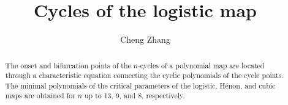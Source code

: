 \documentclass[twocolumn]{revtex4-1}
\begin{document}
\newcommand{\odd}{\mathrm{odd}}

\newcommand{\vct}[1]{\mathbf{#1}}




\newcommand{\vx}{\vct x}
\newcommand{\Tr}{\mathrm{Tr}}
\newcommand{\Pset}{\mathcal P}
\newcommand{\NB}{N_\Pset}
\newcommand{\Rlam}{(R, \lambda)}

\newcommand{\eq}{Eq.}
\newcommand{\eqs}{Eqs.}
\newcommand{\req}[1]{(\ref{eq:#1})}
\newcommand{\refeq}[1]{\eq\,\req{#1}}
\newcommand{\refeqs}[1]{\eqs\,\req{#1}}
\newcommand{\reqsub}[2]{(\ref{eq:#1}#2)}
\newcommand{\refeqsub}[2]{\eq\,\reqsub{#1}{#2}}
\newcommand{\refeqssub}[2]{\eqs\,\reqsub{#1}{#2}}

\newcommand{\refthm}[1]{Theorem \ref{thm:#1}}
\newcommand{\refthms}[1]{Theorems \ref{thm:#1}}
\newcommand{\refsec}[1]{Section \ref{sec:#1}}
\newcommand{\refsecs}[1]{Sections \ref{sec:#1}}
\newcommand{\refapd}[1]{Appendix \ref{apd:#1}}
\newcommand{\reftab}[1]{Table \ref{tab:#1}}
\newcommand{\reftabs}[1]{Tables \ref{tab:#1}}
\newcommand{\reffig}[1]{Fig. \ref{fig:#1}}
\newcommand{\reffigs}[1]{Figs. \ref{fig:#1}}

\newtheorem{theorem}{Theorem}
\newenvironment{remark}[1][1]%
{\par\noindent\textbf{Remark #1.} }{\medskip}






\title{Cycles of the logistic map}
\author{Cheng Zhang}

\begin{abstract}
%
The onset and bifurcation points of the $n$-cycles of
  a polynomial map are located
  through a characteristic equation
  connecting the cyclic polynomials of the cycle points.
The minimal polynomials of the critical parameters
  of the logistic, H\'enon, and cubic maps are obtained
  for $n$ up to 13, 9, and 8,
  respectively.
%
\end{abstract}
\maketitle
\end{document}
